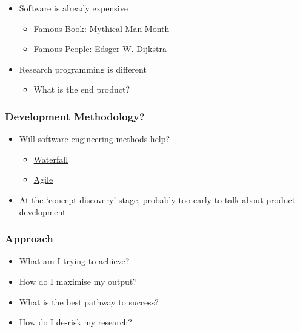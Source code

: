 \begin{itemize}
\itemsep1pt\parskip0pt
\item
  Software is already expensive

  \begin{itemize}
  \itemsep1pt\parskip0pt
  \item
    Famous Book:
    \href{http://www.amazon.co.uk/Mythical-Man-month-Essays-Software-Engineering/dp/0201835959/ref=sr_1_1?ie=UTF8\&qid=1452507457\&sr=8-1\&keywords=mythical+man+month}{Mythical
    Man Month}
  \item
    Famous People: \href{https://www.cs.utexas.edu/users/EWD/}{Edsger W.
    Dijkstra}
  \end{itemize}
\item
  Research programming is different

  \begin{itemize}
  \itemsep1pt\parskip0pt
  \item
    What is the end product?
  \end{itemize}
\end{itemize}

\subsubsection{Development Methodology?}\label{development-methodology}

\begin{itemize}
\itemsep1pt\parskip0pt
\item
  Will software engineering methods help?

  \begin{itemize}
  \itemsep1pt\parskip0pt
  \item
    \href{https://en.wikipedia.org/wiki/Waterfall_model}{Waterfall}
  \item
    \href{https://en.wikipedia.org/wiki/Agile_software_development}{Agile}
  \end{itemize}
\item
  At the `concept discovery' stage, probably too early to talk about
  product development
\end{itemize}

\subsubsection{Approach}\label{approach}

\begin{itemize}
\itemsep1pt\parskip0pt
\item
  What am I trying to achieve?
\item
  How do I maximise my output?
\item
  What is the best pathway to success?
\item
  How do I de-risk my research?
\end{itemize}

